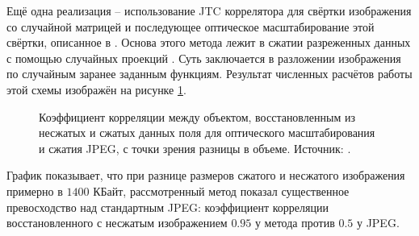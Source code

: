 \FloatBarrier\par
Ещё одна реализация -- использование JTC коррелятора для свёртки изображения со случайной матрицей \cite{velez2016optical} и последующее оптическое масштабирование этой свёртки, описанное в \cite{trejos2016optical}. Основа этого метода лежит в сжатии разреженных данных с помощью случайных проекций \cite{amador2007random}. Суть заключается в разложении изображения по случайным заранее заданным функциям. Результат численных расчётов работы этой схемы изображён на рисунке \ref{ris:RandomProjRes}.
\begin{figure}[htbp]
	\caption{Коэффициент корреляции между объектом, восстановленным из несжатых и сжатых данных поля для оптического масштабирования и сжатия JPEG, с точки зрения разницы в объеме. Источник: \cite{velez2016optical}.}
	\label{ris:RandomProjRes}
\end{figure}
График показывает, что при разнице размеров сжатого и несжатого изображения примерно в $1400$ КБайт, рассмотренный метод показал существенное превосходство над стандартным JPEG: коэффициент корреляции восстановленного с несжатым изображением $0.95$ у метода против $0.5$ у JPEG.





